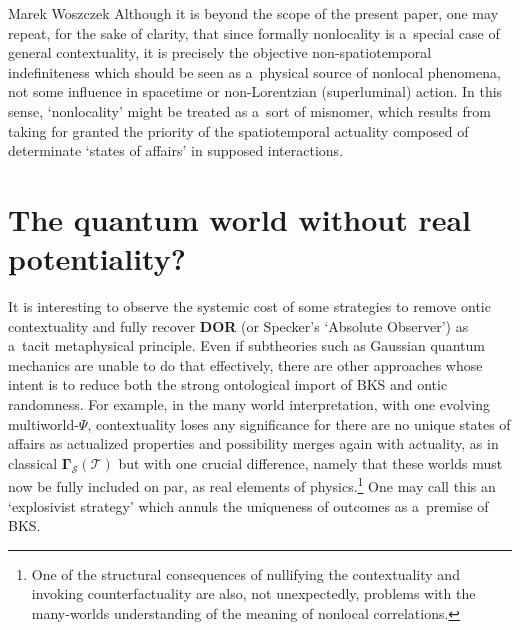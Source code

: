 \begin{artengenv}{Marek Woszczek}
Although it is beyond the scope of the present paper, one may repeat, for the sake of clarity, that since formally nonlocality is a~special case of general contextuality, it is precisely the objective non-spatiotemporal indefiniteness which should be seen as a~physical source of nonlocal phenomena, not some influence in spacetime or non-Lorentzian (superluminal) action. In this sense, ‘nonlocality' might be treated as a~sort of misnomer, which results from taking for granted the priority of the spatiotemporal actuality composed of determinate ‘states of affairs' in supposed interactions.

\section{The quantum world without real potentiality?}
It is interesting to observe the systemic cost of some strategies to remove ontic contextuality and fully recover \textbf{DOR} (or Specker's ‘Absolute Observer') as a~tacit metaphysical principle. Even if subtheories such as Gaussian quantum mechanics are unable to do that effectively, there are other approaches whose intent is to reduce both the strong ontological import of BKS and ontic randomness. For example, in the many world interpretation, with one evolving multiworld-$\Psi$, contextuality loses any significance for there are no unique states of affairs as actualized properties and possibility merges again with actuality, as in classical $\bm{\Gamma}_{\mathcal{S}}(\mathcal{T})$ but with one crucial difference, namely that these worlds must now be fully included on par, as real elements of physics.\footnote{One of the structural consequences of nullifying the contextuality and invoking counterfactuality are also, not unexpectedly, problems with the many-worlds understanding of the meaning of nonlocal correlations.} One may call this an ‘explosivist strategy' which annuls the uniqueness of outcomes as a~premise of BKS.


\end{artengenv}
